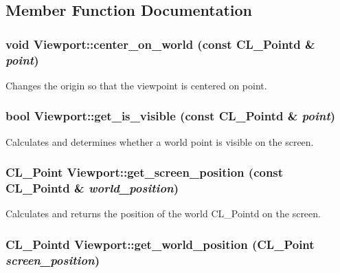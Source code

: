 \subsection{Member Function Documentation}
\hypertarget{classViewport_acacc14d6b2ca0f48734b0ae392938886}{
\subsubsection[{center\_\-on\_\-world}]{\setlength{\rightskip}{0pt plus 5cm}void Viewport::center\_\-on\_\-world (const CL\_\-Pointd \& {\em point})}}
\label{classViewport_acacc14d6b2ca0f48734b0ae392938886}
Changes the origin so that the viewpoint is centered on point. \hypertarget{classViewport_a4a80ef891f5678d6debdaa8a988a5bd0}{
\subsubsection[{get\_\-is\_\-visible}]{\setlength{\rightskip}{0pt plus 5cm}bool Viewport::get\_\-is\_\-visible (const CL\_\-Pointd \& {\em point})}}
\label{classViewport_a4a80ef891f5678d6debdaa8a988a5bd0}
Calculates and determines whether a world point is visible on the screen. \hypertarget{classViewport_a6fa5e4483a38e8775252bfa1467cdc77}{
\subsubsection[{get\_\-screen\_\-position}]{\setlength{\rightskip}{0pt plus 5cm}CL\_\-Point Viewport::get\_\-screen\_\-position (const CL\_\-Pointd \& {\em world\_\-position})}}
\label{classViewport_a6fa5e4483a38e8775252bfa1467cdc77}
Calculates and returns the position of the world CL\_\-Pointd on the screen. \hypertarget{classViewport_ab6c214c3791a3314711e933e831d6ed0}{
\subsubsection[{get\_\-world\_\-position}]{\setlength{\rightskip}{0pt plus 5cm}CL\_\-Pointd Viewport::get\_\-world\_\-position (CL\_\-Point {\em screen\_\-position})}}

